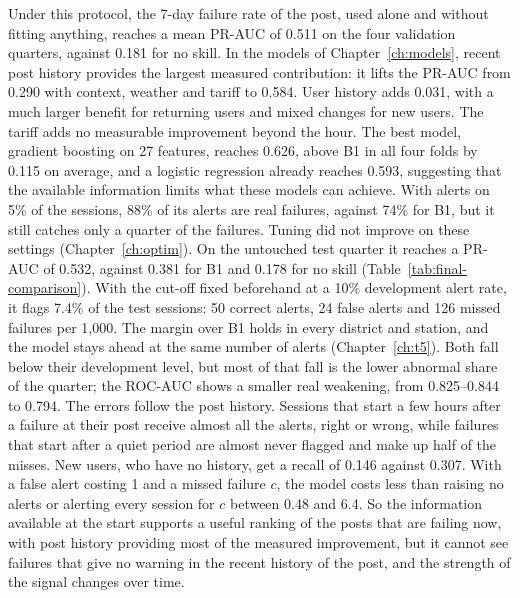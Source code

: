\documentclass[12pt,a4paper,openany]{report}
\begin{document}
Under this protocol, the 7-day failure rate of the post, used alone and without fitting anything, reaches a mean
\acs{PR-AUC} of 0.511 on the four validation quarters, against 0.181 for no skill. In the models of
Chapter~\ref{ch:models}, recent post history provides the largest measured contribution: it lifts the \acs{PR-AUC} from 0.290 with context, weather and tariff to 0.584.
User history adds 0.031, with a much larger benefit for returning users and mixed changes for new users. The tariff
adds no measurable improvement beyond the hour. The best model, gradient boosting on 27 features, reaches 0.626, above B1 in all four folds by 0.115 on average, and a logistic regression
already reaches 0.593, suggesting that the available information limits what these models can achieve. With alerts on 5\% of the sessions, 88\% of its alerts
are real failures, against 74\% for B1, but it still catches only a quarter of the failures. Tuning did not
improve on these settings (Chapter~\ref{ch:optim}).
On the untouched test quarter it reaches a \acs{PR-AUC} of 0.532, against 0.381 for B1
and 0.178 for no skill (Table~\ref{tab:final-comparison}). With the cut-off fixed beforehand at a 10\% development alert rate, it flags 7.4\% of the
test sessions: 50 correct alerts, 24 false alerts and 126 missed failures per 1,000. The margin over B1 holds in every district and station, and the model stays ahead at the same number of
alerts (Chapter~\ref{ch:t5}). Both fall below their development level, but most of that fall is the lower abnormal
share of the quarter; the \acs{ROC-AUC} shows a smaller real weakening, from 0.825--0.844 to 0.794. The errors follow
the post history. Sessions that start a few hours after a failure at their post receive almost all the alerts, right
or wrong, while failures that start after a quiet period are almost never flagged and make up half of the misses.
New users, who have no history, get a recall of 0.146 against 0.307. With a false alert costing 1 and a missed
failure $c$, the model costs less than raising no alerts or alerting every session for $c$ between 0.48 and 6.4. So
the information available at the start supports a useful ranking of the posts that are failing now, with post
history providing most of the measured improvement, but it cannot see failures that give no warning in the recent
history of the post, and the strength of the signal changes over time.
\end{document}
